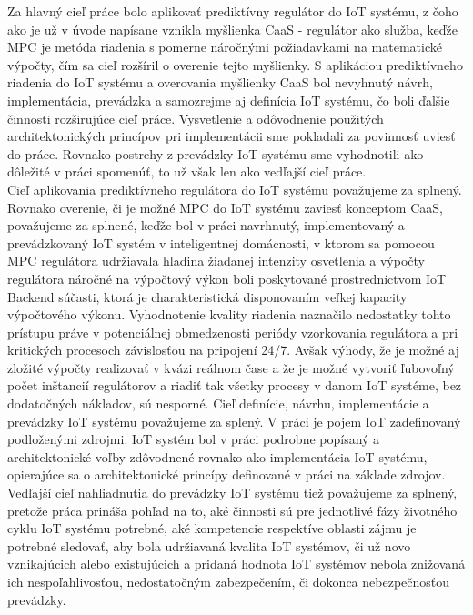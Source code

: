 Za hlavný cieľ práce bolo aplikovať prediktívny regulátor do IoT systému, z čoho ako je už v úvode napísane vznikla myšlienka CaaS - regulátor ako služba, keďže MPC je metóda riadenia s pomerne náročnými požiadavkami na matematické výpočty, čím sa cieľ rozšíril o overenie tejto myšlienky. S aplikáciou prediktívneho riadenia do IoT systému a overovania myšlienky CaaS bol nevyhnutý návrh, implementácia, prevádzka a samozrejme aj definícia IoT systému, čo boli ďalšie činnosti rozširujúce cieľ práce. Vysvetlenie a odôvodnenie použitých architektonických princípov pri implementácii sme pokladali za povinnosť uviesť do práce. Rovnako postrehy z prevádzky IoT systému sme vyhodnotili ako dôležité v práci spomenúť, to už však len ako vedľajší cieľ práce.\\
\indent Cieľ aplikovania prediktívneho regulátora do IoT systému považujeme za splnený. Rovnako overenie, či je možné MPC do IoT systému zaviesť konceptom CaaS, považujeme za splnené, keďže bol v práci navrhnutý, implementovaný a prevádzkovaný IoT systém v inteligentnej domácnosti, v ktorom sa pomocou MPC regulátora udržiavala hladina žiadanej intenzity osvetlenia a výpočty regulátora náročné na výpočtový výkon boli poskytované prostredníctvom IoT Backend súčasti, ktorá je charakteristická disponovaním veľkej kapacity výpočtového výkonu. Vyhodnotenie kvality riadenia naznačilo nedostatky tohto prístupu práve v potenciálnej obmedzenosti periódy vzorkovania regulátora a pri kritických procesoch závislosťou na pripojení 24/7. Avšak výhody, že je možné aj zložité výpočty realizovať v kvázi reálnom čase a že je možné vytvoriť ľubovoľný počet inštancií regulátorov a riadiť tak všetky procesy v danom IoT systéme, bez dodatočných nákladov, sú nesporné. Cieľ definície, návrhu, implementácie a prevádzky IoT systému považujeme za splený. V práci je pojem IoT zadefinovaný podloženými zdrojmi. IoT systém bol v práci podrobne popísaný a architektonické voľby zdôvodnené rovnako ako implementácia IoT systému, opierajúce sa o architektonické princípy definované v práci na základe zdrojov. Vedľajší cieľ nahliadnutia do prevádzky IoT systému tiež považujeme za splnený, pretože práca prináša pohľad na to, aké činnosti sú pre jednotlivé fázy životného cyklu IoT systému potrebné, aké kompetencie respektíve oblasti zájmu je potrebné sledovať, aby bola udržiavaná kvalita IoT systémov, či už novo vznikajúcich alebo existujúcich a pridaná hodnota IoT systémov nebola znižovaná ich nespoľahlivosťou, nedostatočným zabezpečením, či dokonca nebezpečnosťou prevádzky.
